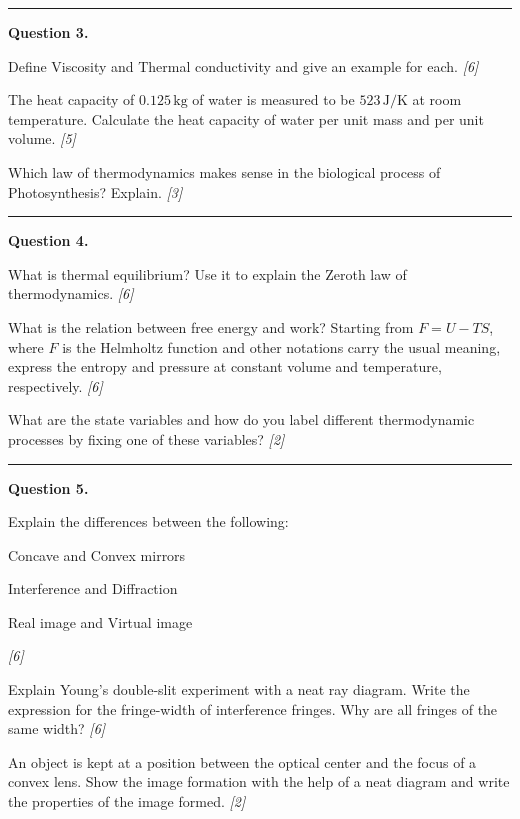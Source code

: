 \documentclass[11pt,a4paper]{article}
\newcommand{\pts}[1]{\hfill   \textit{[#1]}}
\begin{document}
\medskip\rule{\linewidth}{0.2pt}




\noindent   \textbf{Question 3.}

\begin{parts}
  \item Define Viscosity and Thermal conductivity and give an example for each. \pts{6}
  \item The heat capacity of $0.125\, \text{kg}$ of water is measured to be $523\, \text{J/K}$ at room temperature. Calculate the heat capacity of water per unit mass and per unit volume. \pts{5}
  \item Which law of thermodynamics makes sense in the biological process of Photosynthesis? Explain. \pts{3}
\end{parts}

\medskip\rule{\linewidth}{0.2pt}




\noindent   \textbf{Question 4.}

\begin{parts}
  \item What is thermal equilibrium? Use it to explain the Zeroth law of thermodynamics. \pts{6}
  \item What is the relation between free energy and work? Starting from $F = U - TS$, where $F$ is the Helmholtz function and other notations carry the usual meaning, express the entropy and pressure at constant volume and temperature, respectively. \pts{6}
  \item What are the state variables and how do you label different thermodynamic processes by fixing one of these variables? \pts{2}
\end{parts}

\medskip\rule{\linewidth}{0.2pt}




\noindent   \textbf{Question 5.}

\begin{parts}
  \item Explain the differences between the following:
    
\begin{parts}
      \item Concave and Convex mirrors
      \item Interference and Diffraction
      \item Real image and Virtual image
    \end{parts} \pts{6}
  \item Explain Young's double-slit experiment with a neat ray diagram. Write the expression for the fringe-width of interference fringes. Why are all fringes of the same width? \pts{6}
  \item An object is kept at a position between the optical center and the focus of a convex lens. Show the image formation with the help of a neat diagram and write the properties of the image formed. \pts{2}
\end{parts}
\end{document}
